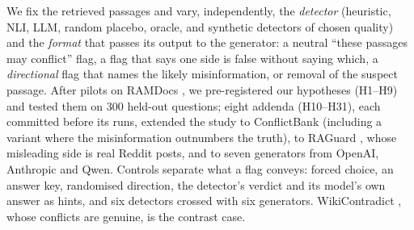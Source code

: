 We fix the retrieved passages and vary, independently, the \emph{detector} (heuristic, NLI, LLM, random placebo,
oracle, and synthetic detectors of chosen quality) and the \emph{format} that passes its output to the generator: a
neutral ``these passages may conflict'' flag, a flag that says one side is false without saying which, a
\emph{directional} flag that names the likely misinformation, or removal of the suspect passage. After pilots on
RAMDocs \citep{wang2025madam}, we pre-registered our hypotheses (H1--H9) and tested them on 300 held-out questions;
eight addenda (H10--H31), each committed before its runs, extended the study to ConflictBank \citep{su2024conflictbank}
(including a variant where the misinformation outnumbers the truth), to RAGuard \citep{zeng2025raguard}, whose
misleading side is real Reddit posts, and to seven generators from OpenAI, Anthropic and Qwen. Controls separate what a
flag conveys: forced choice, an answer key, randomised direction, the detector's verdict and its model's own answer as
hints, and six detectors crossed with six generators. WikiContradict \citep{hou2024wikicontradict}, whose conflicts are genuine, is the contrast case.

